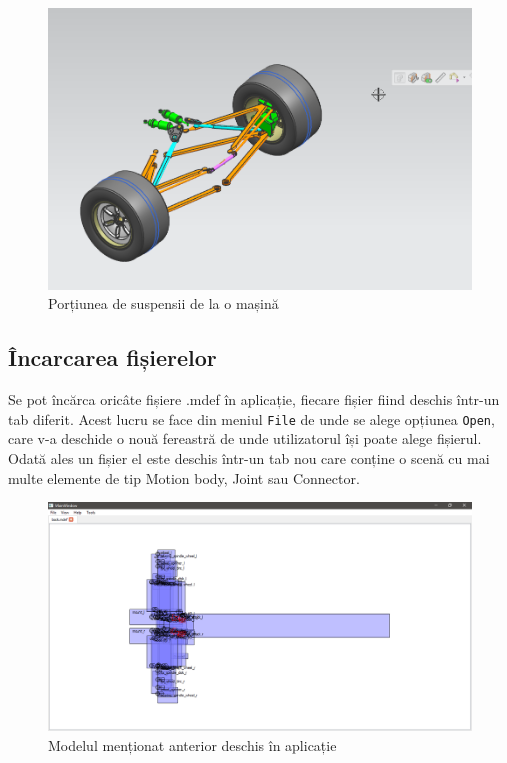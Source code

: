 \begin{figure}[H]
    \begin{center}
        \includegraphics[scale=0.3]{imagini/implementare/model.png}        
    \end{center}
    \caption{Porțiunea de suspensii de la o mașină}
    \label{fig:tabs}
\end{figure}

\subsection{Încarcarea fișierelor}
Se pot încărca oricâte fișiere .mdef în aplicație, fiecare fișier fiind deschis într-un tab diferit. 
Acest lucru se face din meniul \verb|File| de unde se alege opțiunea \verb|Open|, care v-a deschide o nouă fereastră de 
unde utilizatorul își poate alege fișierul. 
Odată ales un fișier el este deschis într-un tab nou care conține o scenă cu mai multe elemente de tip Motion body, 
Joint sau Connector.\newline

\begin{figure}[H]
    \includegraphics[width=\linewidth]{imagini/implementare/overlapping.png}
    \caption{Modelul menționat anterior deschis în aplicație}
    \label{fig:tabs}
\end{figure}

